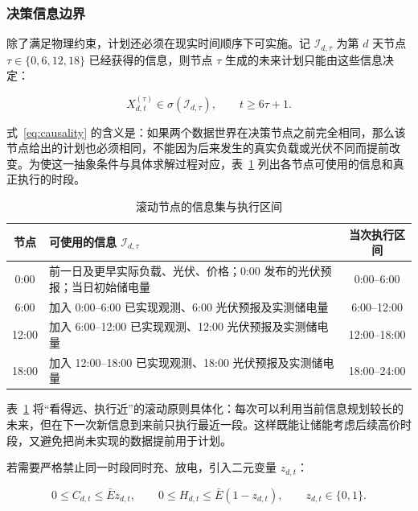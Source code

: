 \subsubsection{决策信息边界}

除了满足物理约束，计划还必须在现实时间顺序下可实施。记 $\mathcal I_{d,\tau}$ 为第 $d$ 天节点 $\tau\in\{0,6,12,18\}$ 已经获得的信息，则节点 $\tau$ 生成的未来计划只能由这些信息决定：

\begin{equation}
    X_{d,t}^{(\tau)}\in\sigma(\mathcal I_{d,\tau}),
    \qquad t\ge6\tau+1 .
    \label{eq:causality}
\end{equation}

式~\eqref{eq:causality} 的含义是：如果两个数据世界在决策节点之前完全相同，那么该节点给出的计划也必须相同，不能因为后来发生的真实负载或光伏不同而提前改变。为使这一抽象条件与具体求解过程对应，表~\ref{tab:information-set} 列出各节点可使用的信息和真正执行的时段。

\begin{table}[htbp]
    \caption{滚动节点的信息集与执行区间}
    \label{tab:information-set}
    \centering
    \begin{tabularx}{0.96\textwidth}{c X c}
        \toprule
        节点 & 可使用的信息 $\mathcal I_{d,\tau}$ & 当次执行区间 \\
        \midrule
        0:00 & 前一日及更早实际负载、光伏、价格；0:00 发布的光伏预报；当日初始储电量 & 0:00--6:00 \\
        6:00 & 加入 0:00--6:00 已实现观测、6:00 光伏预报及实测储电量 & 6:00--12:00 \\
        12:00 & 加入 6:00--12:00 已实现观测、12:00 光伏预报及实测储电量 & 12:00--18:00 \\
        18:00 & 加入 12:00--18:00 已实现观测、18:00 光伏预报及实测储电量 & 18:00--24:00 \\
        \bottomrule
    \end{tabularx}
\end{table}

表~\ref{tab:information-set} 将“看得远、执行近”的滚动原则具体化：每次可以利用当前信息规划较长的未来，但在下一次新信息到来前只执行最近一段。这样既能让储能考虑后续高价时段，又避免把尚未实现的数据提前用于计划。

若需要严格禁止同一时段同时充、放电，引入二元变量 $z_{d,t}$：

\begin{equation}
    0\le C_{d,t}\le\bar E z_{d,t},\qquad
    0\le H_{d,t}\le\bar E(1-z_{d,t}),
    \qquad z_{d,t}\in\{0,1\}.
    \label{eq:mutual-exclusive}
\end{equation}

